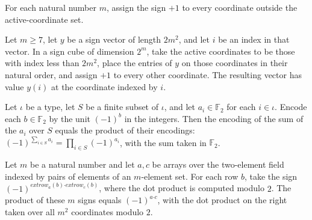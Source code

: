 \begin{definition}
\label{FABL.ac0InactiveAssignment}
\leanok
{}
For each natural number $m$, assign the sign $+1$ to every coordinate outside the
active-coordinate set.
\end{definition}

\begin{theorem}
\label{FABL.combine_ac0ActiveCoordinates}
\leanok
{}
Let $m\ge 7$, let $y$ be a sign vector of length $2m^2$, and let $i$ be an index in that
vector. In a sign cube of dimension $2^m$, take the active coordinates to be those with
index less than $2m^2$, place the entries of $y$ on those coordinates in their natural
order, and assign $+1$ to every other coordinate. The resulting vector has value $y(i)$
at the coordinate indexed by $i$.
\end{theorem}

\begin{theorem}
\label{FABL.signEncode_sum}
\leanok
{}
Let $\iota$ be a type, let $S$ be a finite subset of $\iota$, and let
$a_i\in\mathbb{F}_2$ for each $i\in\iota$. Encode each $b\in\mathbb{F}_2$ by the unit
$(-1)^b$ in the integers. Then the encoding of the sum of the $a_i$ over $S$ equals the
product of their encodings: $(-1)^{\sum_{i\in S}a_i}=\prod_{i\in S}(-1)^{a_i}$, with the
sum taken in $\mathbb{F}_2$.
\end{theorem}

\begin{theorem}
\label{FABL.prod_innerProductModTwoBoolean_blocks}
\leanok
{}
Let $m$ be a natural number and let $a,c$ be arrays over the two-element field indexed
by pairs of elements of an $m$-element set. For each row $b$, take the sign
$(-1)^{	ext{row}_a(b)\boldsymbol{\cdot}	ext{row}_c(b)}$, where the dot product is computed
modulo $2$. The product of these $m$ signs equals $(-1)^{a\boldsymbol{\cdot}c}$, with the
dot product on the right taken over all $m^2$ coordinates modulo $2$.
\end{theorem}

